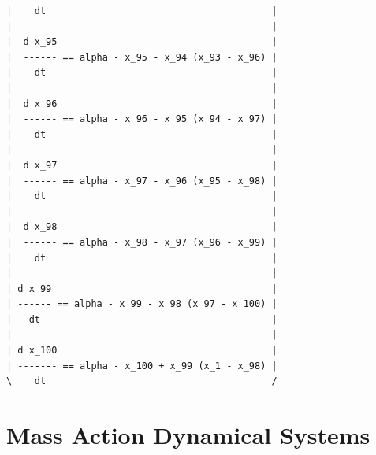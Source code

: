 {\begin{verbatim}
|    dt                                        |
|                                              |
|  d x_95                                      |
|  ------ == alpha - x_95 - x_94 (x_93 - x_96) |
|    dt                                        |
|                                              |
|  d x_96                                      |
|  ------ == alpha - x_96 - x_95 (x_94 - x_97) |
|    dt                                        |
|                                              |
|  d x_97                                      |
|  ------ == alpha - x_97 - x_96 (x_95 - x_98) |
|    dt                                        |
|                                              |
|  d x_98                                      |
|  ------ == alpha - x_98 - x_97 (x_96 - x_99) |
|    dt                                        |
|                                              |
| d x_99                                       |
| ------ == alpha - x_99 - x_98 (x_97 - x_100) |
|   dt                                         |
|                                              |
| d x_100                                      |
| ------- == alpha - x_100 + x_99 (x_1 - x_98) |
\    dt                                        /

\end{verbatim} 
    }
\color{black}


\section{Mass Action Dynamical Systems}


